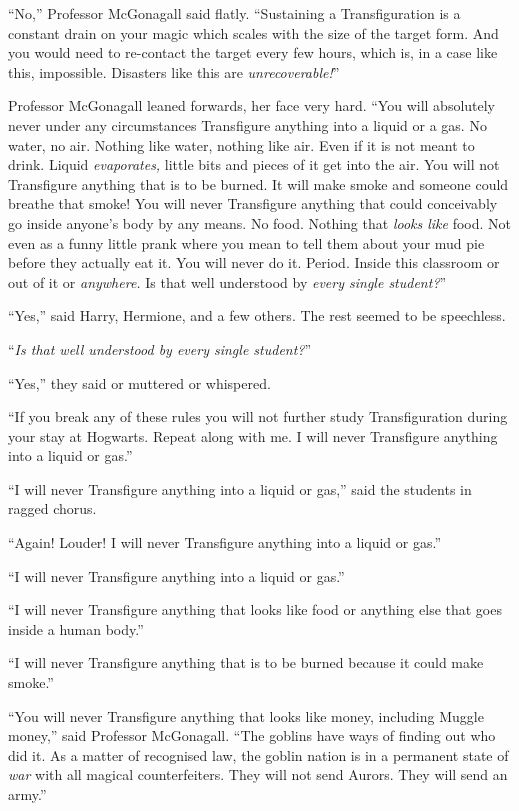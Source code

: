 “No,” Professor McGonagall said flatly. “Sustaining a Transfiguration is a constant drain on your magic which scales with the size of the target form. And you would need to re-contact the target every few hours, which is, in a case like this, impossible. Disasters like this are \emph{unrecoverable!}”

Professor McGonagall leaned forwards, her face very hard. “You will absolutely never under any circumstances Transfigure anything into a liquid or a gas. No water, no air. Nothing like water, nothing like air. Even if it is not meant to drink. Liquid \emph{evaporates,} little bits and pieces of it get into the air. You will not Transfigure anything that is to be burned. It will make smoke and someone could breathe that smoke! You will never Transfigure anything that could conceivably go inside anyone’s body by any means. No food. Nothing that \emph{looks like} food. Not even as a funny little prank where you mean to tell them about your mud pie before they actually eat it. You will never do it. Period. Inside this classroom or out of it or \emph{anywhere.} Is that well understood by \emph{every single student?}”

“Yes,” said Harry, Hermione, and a few others. The rest seemed to be speechless.

“\emph{Is that well understood by every single student?}”

“Yes,” they said or muttered or whispered.

“If you break any of these rules you will not further study Transfiguration during your stay at Hogwarts. Repeat along with me. I will never Transfigure anything into a liquid or gas.”

“I will never Transfigure anything into a liquid or gas,” said the students in ragged chorus.

“Again! Louder! I will never Transfigure anything into a liquid or gas.”

“I will never Transfigure anything into a liquid or gas.”

“I will never Transfigure anything that looks like food or anything else that goes inside a human body.”

“I will never Transfigure anything that is to be burned because it could make smoke.”

“You will never Transfigure anything that looks like money, including Muggle money,” said Professor McGonagall. “The goblins have ways of finding out who did it. As a matter of recognised law, the goblin nation is in a permanent state of \emph{war} with all magical counterfeiters. They will not send Aurors. They will send an army.”


